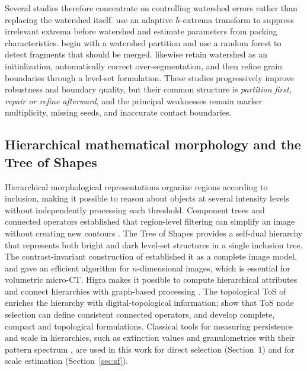\documentclass[12pt]{article}
\begin{document}
Several studies therefore concentrate on controlling watershed errors rather than replacing the watershed
itself. \citet{burgmann2022} use an adaptive $h$-extrema transform to suppress irrelevant extrema before watershed
and estimate parameters from packing characteristics. \citet{alshembari2024} begin with a watershed partition and
use a random forest to detect fragments that should be merged. \citet{wang2025} likewise retain watershed as an
initialization, automatically correct over-segmentation, and then refine grain boundaries through a level-set
formulation. These studies progressively improve robustness and boundary quality, but their common structure is
\emph{partition first, repair or refine afterward}, and the principal weaknesses remain marker multiplicity,
missing seeds, and inaccurate contact boundaries.

\subsection{Hierarchical mathematical morphology and the Tree of Shapes}

Hierarchical morphological representations organize regions according to inclusion, making it possible to reason
about objects at several intensity levels without independently processing each threshold. Component trees and
connected operators established that region-level filtering can simplify an image without creating new contours
\citep{salembier1998}. The Tree of Shapes provides a self-dual hierarchy that represents both bright and dark
level-set structures in a single inclusion tree. The contrast-invariant construction of \citet{monasse2000}
established it as a complete image model, and \citet{geraud2013} gave an efficient algorithm for $n$-dimensional
images, which is essential for volumetric micro-CT. Higra makes it possible to compute hierarchical attributes and
connect hierarchies with graph-based processing \citep{perret2019}. The topological ToS of \citet{passat2022}
enriches the hierarchy with digital-topological information; \citet{mendesforte2025} show that ToS node selection
can define consistent connected operators, and \citet{mendesforte2026} develop complete, compact and topological
formulations. Classical tools for measuring persistence and scale in hierarchies, such as extinction values
\citep{vachier1995} and granulometries with their pattern spectrum \citep{matheron1975,maragos1989}, are used in
this work for direct selection (Section~1) and for scale estimation (Section~\ref{sec:sf}).
\end{document}
